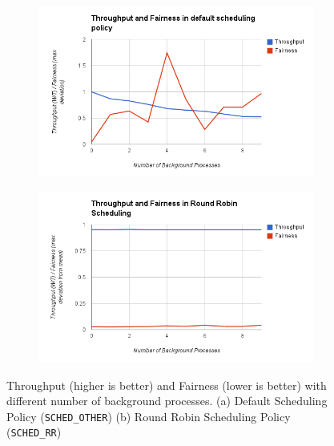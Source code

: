 \documentclass[10pt] {article}
\begin{document}
\begin{figure}[ht!]
\centering
\begin{subfigure}{.5\textwidth}
  \centering
  \includegraphics[width=\linewidth]{th_vs_fair.png}
  \caption{}
  \label{fig:thvsfair1}
\end{subfigure}%
\begin{subfigure}{.5\textwidth}
  \centering
  \includegraphics[width=\linewidth]{rr_th_fair.png}
  \caption{}
  \label{fig:thvsfair2}
\end{subfigure}
\caption{Throughput (higher is better) and Fairness (lower is better) with different number of background processes. (a) Default Scheduling Policy (\texttt{SCHED\_OTHER}) (b) Round Robin Scheduling Policy (\texttt{SCHED\_RR})}
\label{fig:thvsfair}
\end{figure}


\end{document}
